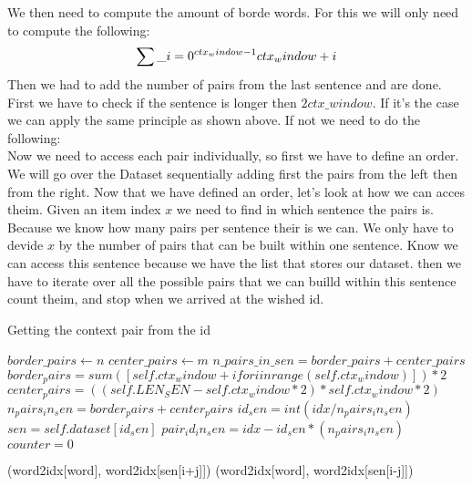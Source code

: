 We then need to compute the amount of borde words. For this we will only need to compute the following:
\begin{equation}
\sum\_{i=0}^{ctx\\_window -1} ctx\\_window + i
\end{equation}
 Then we had to add the number of pairs from the last sentence and are done. First  we have to check if the sentence is longer then $2 ctx\_window$. 
 If it's the case we can apply the same principle as shown above. If not we need to do the following:\\
Now we need to access each pair individually, so first we have to define an order. We will go over the Dataset sequentially adding first the pairs from the left then from the right. Now that we have defined an order, let's look at how we can acces theim. Given an item index $x$ we need to find in which sentence the pairs is. Because we know how many pairs per sentence their is we can. We only have to devide $x$ by the number of pairs that can be built within one sentence. Know we can access this sentence because we have the list that stores our dataset. then we have to iterate over all the possible pairs that we can builld within this sentence count theim, and stop when we arrived at the wished id. 

\begin{algorithm}
\caption{Getting the context pair from the id}
\label{alg1}
\begin{algorithmic}[1]
\STATE $border\_pairs \leftarrow n$
\STATE $ center\_pairs \leftarrow m$
\STATE $ n\_pairs\_in\_sen = border\_pairs  + center\_pairs$
 \STATE$ border_pairs = sum([self.ctx_window + i for i in range(self.ctx_window)])*2$
        \STATE $center_pairs = ((self.LEN_SEN - self.ctx_window*2)*self.ctx_window*2)$
        \STATE $n_pairs_in_sen = border_pairs + center_pairs$
        \STATE $id_sen = int(idx/n_pairs_in_sen)$
\STATE         $sen  = self.dataset[id_sen]$
       \STATE  $pair_id_in_sen = idx - id_sen*(n_pairs_in_sen)$
        \STATE $counter = 0$

\RETURN (word2idx[word], word2idx[sen[i+j]])
\ENDIF
\ENDIF
{}
\RETURN (word2idx[word], word2idx[sen[i-j]])
\ENDIF
\ENDIF
\ENDFOR
\ENDFOR
\end{algorithmic}
\end{algorithm}

